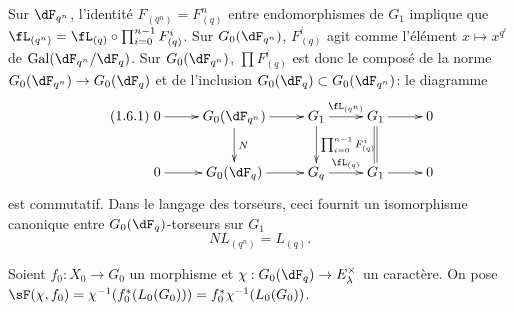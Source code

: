 Sur $\dF_{q^n}$, l'identité $F_{(q^n)}=F_{(q)}^n$ entre endomorphismes de 
$G_1$ implique que $\fL_{(q^n)}=\fL_{(q)}\circ \prod_{i=0}^{n-1} F_{(q)}^i$. 
Sur $G_0(\dF_{q^n})$, $F_{(q)}^i$ agit comme l'élément 
$x\mapsto x^{q^i}$ de $\gal(\dF_{q^n}/\dF_q)$. Sur $G_0(\dF_{q^n})$, 
$\prod F_{(q)}^i$ est donc le composé de la norme 
$G_0(\dF_{q^n})\to G_0(\dF_q)$ et de l'inclusion 
$G_0(\dF_q)\subset G_0(\dF_{q^n})$: le diagramme 
\begin{equation*}\tag{1.6.1}\label{VI:eq:1-6-1}
\xymatrix{
  0 \ar[r] 
    & G_0(\dF_{q^n}) \ar[r] \ar[d]^-N 
    & G_1 \ar[r]^-{\fL_{(q^n)}} \ar[d]^-{\prod_{i=0}^{n-1} F_{(q)}^i} 
    & G_1 \ar[r] \ar@{=}[d] 
    & 0 \\
  0 \ar[r] 
    & G_0(\dF_q) \ar[r] 
    & G_q \ar[r]^-{\fL_{(q)}} 
    & G_1 \ar[r] 
    & 0
}
\end{equation*}
est commutatif. Dans le langage des torseurs, ceci fournit un isomorphisme 
canonique entre $G_0(\dF_q)$-torseurs sur $G_1$ 
\begin{equation*}\tag{1.6.2}\label{VI:eq:1-6-2}
  N L_{(q^n)} = L_{(q)} \text{.}
\end{equation*}





\begin{definition_}\label{VI:1-7}
Soient $f_0:X_0\to G_0$ un morphisme et 
$\chi:G_0(\dF_q)\to E_\lambda^\times$ un caractère. On pose 
$\sF(\chi,f_0) = \chi^{-1}(f_0^\ast (L_0(G_0))) = f_0^\ast\chi^{-1}(L_0(G_0))$. 
\end{definition_}

